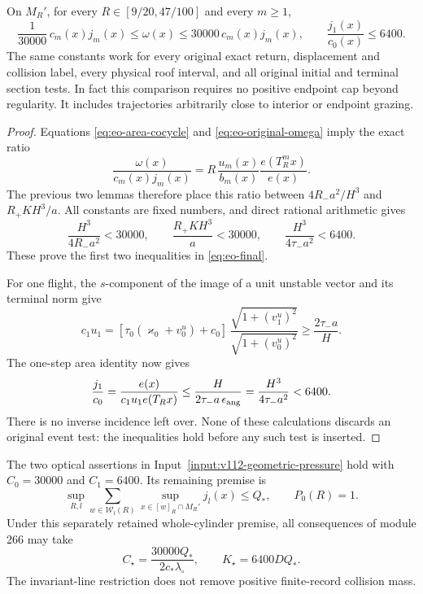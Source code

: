 \begin{theorem}
\label{thm:eo-optical}
On $M_R'$, for every $R\in[9/20,47/100]$ and every $m\ge1$,
\begin{equation}\label{eq:eo-final}
 \frac1{30000}\,c_m(x)j_m(x)
       \le\omega(x)\le30000\,c_m(x)j_m(x),\qquad
                   \frac{j_1(x)}{c_0(x)}\le6400.
\end{equation}
The same constants work for every original exact return,
displacement and collision label, every physical roof interval,
and all original initial and terminal section tests.
In fact this comparison requires no positive endpoint cap beyond
regularity.  It includes trajectories arbitrarily close to
interior or endpoint grazing.
\end{theorem}

\begin{proof}
Equations \eqref{eq:eo-area-cocycle} and
\eqref{eq:eo-original-omega} imply the exact ratio
\begin{equation}\label{eq:eo-ratio}
 \frac{\omega(x)}{c_m(x)j_m(x)}
             =R\,\frac{u_m(x)}{b_m(x)}
                          \frac{e(T_R^mx)}{e(x)}.
\end{equation}
The previous two lemmas therefore place this ratio between
$4R_-a^2/H^3$ and $R_+KH^3/a$.
All constants are fixed numbers, and direct rational arithmetic
gives
\begin{equation}\label{eq:eo-rational-budget}
 \frac{H^3}{4R_-a^2}<30000,\qquad
 \frac{R_+KH^3}{a}<30000,\qquad
 \frac{H^3}{4\tau_-a^2}<6400.
\end{equation}
These prove the first two inequalities in \eqref{eq:eo-final}.

For one flight, the $s$-component of the image of a unit
unstable vector and its terminal norm give
\[
 c_1u_1
  =[\tau_0(\varkappa_0+v^u_0)+c_0]\,
       \frac{\sqrt{1+(v^u_1)^2}}{\sqrt{1+(v^u_0)^2}}
                    \ge\frac{2\tau_-a}{H}.
\]
The one-step area identity now gives
\[
 \frac{j_1}{c_0}
    =\frac{e(x)}{c_1u_1e(T_Rx)}
    \le\frac{H}{2\tau_-a\,\epsilon_{\rm ang}}
    =\frac{H^3}{4\tau_-a^2}<6400.
\]
There is no inverse incidence left over.  None of these
calculations discards an original event test: the inequalities
hold before any such test is inserted.
\end{proof}

\begin{corollary}
\label{cor:eo-pressure-scope}
The two optical assertions in
Input~\ref{input:v112-geometric-pressure} hold with
$C_0=30000$ and $C_1=6400$.  Its remaining premise is
\[
              \sup_{R,l}
                 \sum_{w\in\mathcal W_l(R)}
                    \sup_{x\in[w]_R\cap M_R'}j_l(x)\le Q_*,
                 \qquad P_0(R)=1.
\]
Under this separately retained whole-cylinder premise, all
consequences of module 266 may take
\[
 C_\star=\frac{30000Q_*}{2c_*\lambda_\circ},
                    \qquad K_\star=6400D Q_*.
\]
The invariant-line restriction does not remove positive
finite-record collision mass.
\end{corollary}

